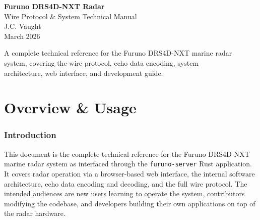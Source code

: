 \documentclass[11pt,letterpaper]{article}
\begin{document}
\begin{titlepage}
    \centering
    \vspace*{2cm}

    {\Huge\bfseries\color{Garnet} Furuno DRS4D-NXT Radar}\\[0.5cm]
    {\LARGE\color{NinetyBlack} Wire Protocol \& System Technical Manual}\\[2cm]

    {\Large J.C. Vaught}\\[0.5cm]
    {\large\color{SeventyBlack} March 2026}\\[3cm]


    \vfill
    {\normalsize\color{SeventyBlack}
    A complete technical reference for the Furuno DRS4D-NXT marine radar\\
    system, covering the wire protocol, echo data encoding, system\\
    architecture, web interface, and development guide.}
    \vspace{2cm}
\end{titlepage}

{\setlength{\parskip}{0pt}\tableofcontents}
\newpage


%
%

\part{Overview \& Usage}
\label{part:usage}


\section{Introduction}
\label{sec:introduction}

This document is the complete technical reference for the Furuno DRS4D-NXT marine radar system as interfaced through the \texttt{furuno-server} Rust application. It covers radar operation via a browser-based web interface, the internal software architecture, echo data encoding and decoding, and the full wire protocol. The intended audiences are new users learning to operate the system, contributors modifying the codebase, and developers building their own applications on top of the radar hardware.
\end{document}
